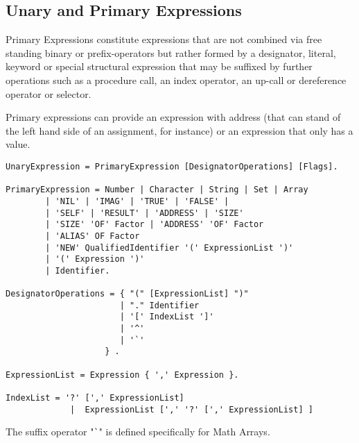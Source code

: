 \documentclass[a4wide,11pt]{article}
\begin{document}
\subsection{Unary and Primary Expressions}

Primary Expressions constitute expressions that are not combined via free standing binary or prefix-operators but rather formed by a designator, literal, keyword or special structural expression that may be suffixed by further operations such as a procedure call, an index operator, an up-call or dereference operator or selector.

Primary expressions can provide an expression with address (that can stand of the left hand side of an assignment, for instance) or an expression that only has a value.

\begin{lstlisting}[style=ebnf]
UnaryExpression = PrimaryExpression [DesignatorOperations] [Flags].

PrimaryExpression = Number | Character | String | Set | Array
        | 'NIL' | 'IMAG' | 'TRUE' | 'FALSE' |
        | 'SELF' | 'RESULT' | 'ADDRESS' | 'SIZE'
        | 'SIZE' 'OF' Factor | 'ADDRESS' 'OF' Factor
        | 'ALIAS' OF Factor
        | 'NEW' QualifiedIdentifier '(' ExpressionList ')'
        | '(' Expression ')'
        | Identifier.

DesignatorOperations = { "(" [ExpressionList] ")"
                       | "." Identifier
                       | '[' IndexList ']'
                       | '^'
                       | '`'
                    } .

ExpressionList = Expression { ',' Expression }.

IndexList = '?' [',' ExpressionList]
             |  ExpressionList [',' '?' [',' ExpressionList] ]
\end{lstlisting}
The suffix operator "\verb~`~" is defined specifically for Math Arrays.
\end{document}

